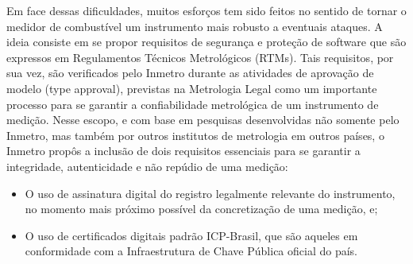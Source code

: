\documentclass[12pt]{article}
\begin{document}
Em face dessas dificuldades, muitos esforços tem sido feitos no sentido de tornar o medidor de combustível um instrumento mais robusto a eventuais ataques.
A ideia consiste em se propor requisitos de segurança e proteção de software que são expressos em Regulamentos Técnicos Metrológicos (RTMs).
Tais requisitos, por sua vez, são verificados pelo Inmetro durante as atividades de aprovação de modelo (type approval), previstas na Metrologia Legal como um importante processo para se garantir a confiabilidade metrológica de um instrumento de medição.
Nesse escopo, e com base em pesquisas desenvolvidas não somente pelo Inmetro, mas também por outros institutos de metrologia em outros países, o Inmetro propôs a inclusão de dois requisitos essenciais para se garantir a integridade, autenticidade e não repúdio de uma medição:

\begin{itemize}
    \item O uso de assinatura digital do registro legalmente relevante do instrumento, no momento mais próximo possível da concretização de uma medição, e;
    \item O uso de certificados digitais padrão ICP-Brasil, que são aqueles em conformidade com a Infraestrutura de Chave Pública oficial do país.
\end{itemize}



% 
% 
% 
% 



\end{document}
